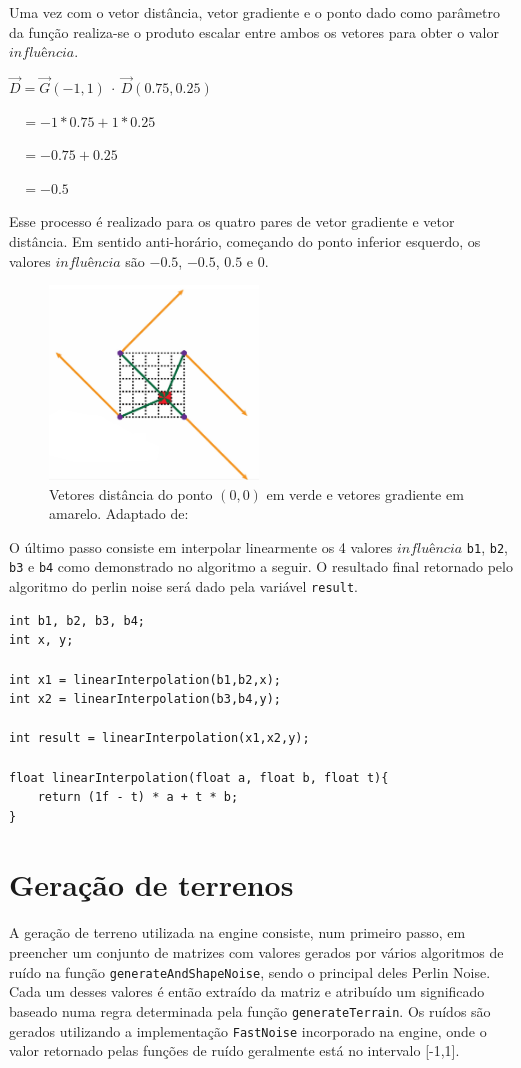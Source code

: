 \documentclass[12pt, 
openright, 
oneside, 
a4paper,    
brazil]{facom-ufu-abntex2}
\begin{document}
Uma vez com o vetor distância, vetor gradiente e o ponto dado como parâmetro da função realiza-se o produto escalar entre ambos os vetores para obter o valor $influência$.

$\vec{D} = \vec{G}(-1,1) ~\cdotp ~ \vec{D}(0.75, 0.25)$

$~~~~ = -1 * 0.75 + 1 *0.25$

$~~~~ = -0.75 + 0.25$

$~~~~ = -0.5$

Esse processo é realizado para os quatro pares de vetor gradiente e vetor distância. Em sentido anti-horário, começando do ponto inferior esquerdo, os valores $influência$ são $-0.5$, $-0.5$, $0.5$ e $0$.
\begin{figure}[H]
	\centering
	\includegraphics[width=15em]{imagens/perlinGradientsAndDistances.png}
	\caption{Vetores distância do ponto $(0,0)$ em verde e vetores gradiente em amarelo. Adaptado de: \cite{Fataho}}
\end{figure}

O último passo consiste em interpolar linearmente os 4 valores $influência$ \texttt{b1}, \texttt{b2}, \texttt{b3} e \texttt{b4} como demonstrado no algoritmo a seguir. O resultado final retornado pelo algoritmo do perlin noise será dado pela variável \texttt{result}.

\begin{lstlisting}[caption=Interpolação dos valores $influência$]
int b1, b2, b3, b4;
int x, y; 

int x1 = linearInterpolation(b1,b2,x);
int x2 = linearInterpolation(b3,b4,y);

int result = linearInterpolation(x1,x2,y);

float linearInterpolation(float a, float b, float t){
	return (1f - t) * a + t * b;
}
\end{lstlisting}
 

\section{Geração de terrenos}
A geração de terreno utilizada na engine consiste, num primeiro passo, em preencher um conjunto de matrizes com valores gerados por vários algoritmos de ruído na função \texttt{generateAndShapeNoise}, sendo o principal deles Perlin Noise. Cada um desses valores é então extraído da matriz e atribuído um significado baseado numa regra determinada pela função \texttt{generateTerrain}. Os ruídos são gerados utilizando a implementação \texttt{FastNoise} \cite{FastNoise} incorporado na engine, onde o valor retornado pelas funções de ruído geralmente está no intervalo [-1,1]. 
\end{document}
